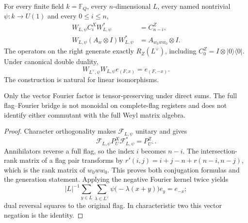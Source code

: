 \begin{theorem}
{\normalfont\statusProved}\quad
For every finite field $k=\mathbb F_Q$, every $n$-dimensional $L$, every
named nontrivial $\psi:k\to U(1)$ and every $0\leq i\leq n$,
\begin{align*}
 W_{L,\psi}C_i^XW_{L,\psi}^*&=C_{n-i}^Z,\\
 W_{L,\psi}(A_w\otimes I)W_{L,\psi}^*
   &=A_{w_0ww_0}\otimes I.
\end{align*}
The operators on the right generate exactly $R_Z(L^\vee)$, including
$C_0^Z=I\otimes|0\rangle\langle0|$.  Under canonical double duality,
\[
 W_{L^\vee,\psi}W_{L,\psi}e_{(F,x)}=e_{(F,-x)}.
\]
The construction is natural for linear isomorphisms.
\end{theorem}
\begin{scope}
Only the vector Fourier factor is tensor-preserving under direct sums.  The
full flag--Fourier bridge is not monoidal on complete-flag registers and does
not identify either commutant with the full Weyl matrix algebra.
\end{scope}
\begin{proof}
Character orthogonality makes $\mathcal F_{L,\psi}$ unitary and gives
\[
 \mathcal F_{L,\psi}P_U^X\mathcal F_{L,\psi}^*=P_{U^\perp}^Z.
\]
Annihilators reverse a full flag, so the index $i$ becomes $n-i$.  The
intersection-rank matrix of a flag pair transforms by
$r'(i,j)=i+j-n+r(n-i,n-j)$, which is the rank matrix of $w_0ww_0$.
This proves both conjugation formulas and the generation statement.
Applying the negative Fourier kernel twice yields
\[
 |L|^{-1}\sum_{y\in L}\sum_{\lambda\in L^\vee}
       \psi\bigl(-\lambda(x+y)\bigr)e_y=e_{-x};
\]
dual reversal squares to the original flag.  In characteristic two this
vector negation is the identity.
\end{proof}

